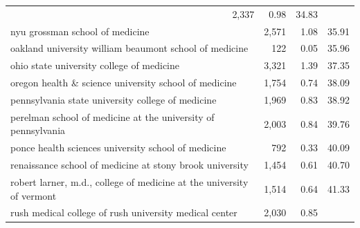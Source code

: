 \begin{table}[!h]
\begin{tabular}{llll}
  \multicolumn{1}{r}{2,337} &
  \multicolumn{1}{r}{0.98} &
  \multicolumn{1}{r}{34.83} \\
\multicolumn{1}{l}{\hspace{1em}nyu grossman school of medicine} &
  \multicolumn{1}{r}{2,571} &
  \multicolumn{1}{r}{1.08} &
  \multicolumn{1}{r}{35.91} \\
\multicolumn{1}{l}{\hspace{1em}oakland university william beaumont school of medicine} &
  \multicolumn{1}{r}{122} &
  \multicolumn{1}{r}{0.05} &
  \multicolumn{1}{r}{35.96} \\
\multicolumn{1}{l}{\hspace{1em}ohio state university college of medicine} &
  \multicolumn{1}{r}{3,321} &
  \multicolumn{1}{r}{1.39} &
  \multicolumn{1}{r}{37.35} \\
\multicolumn{1}{l}{\hspace{1em}oregon health \& science university school of medicine} &
  \multicolumn{1}{r}{1,754} &
  \multicolumn{1}{r}{0.74} &
  \multicolumn{1}{r}{38.09} \\
\multicolumn{1}{l}{\hspace{1em}pennsylvania state university college of medicine} &
  \multicolumn{1}{r}{1,969} &
  \multicolumn{1}{r}{0.83} &
  \multicolumn{1}{r}{38.92} \\
\multicolumn{1}{l}{\hspace{1em}perelman school of medicine at the university of pennsylvania} &
  \multicolumn{1}{r}{2,003} &
  \multicolumn{1}{r}{0.84} &
  \multicolumn{1}{r}{39.76} \\
\multicolumn{1}{l}{\hspace{1em}ponce health sciences university school of medicine} &
  \multicolumn{1}{r}{792} &
  \multicolumn{1}{r}{0.33} &
  \multicolumn{1}{r}{40.09} \\
\multicolumn{1}{l}{\hspace{1em}renaissance school of medicine at stony brook university} &
  \multicolumn{1}{r}{1,454} &
  \multicolumn{1}{r}{0.61} &
  \multicolumn{1}{r}{40.70} \\
\multicolumn{1}{l}{\hspace{1em}robert larner, m.d., college of medicine at the university of vermont} &
  \multicolumn{1}{r}{1,514} &
  \multicolumn{1}{r}{0.64} &
  \multicolumn{1}{r}{41.33} \\
\multicolumn{1}{l}{\hspace{1em}rush medical college of rush university medical center} &
  \multicolumn{1}{r}{2,030} &
  \multicolumn{1}{r}{0.85} &

\end{tabular}
\end{table}
